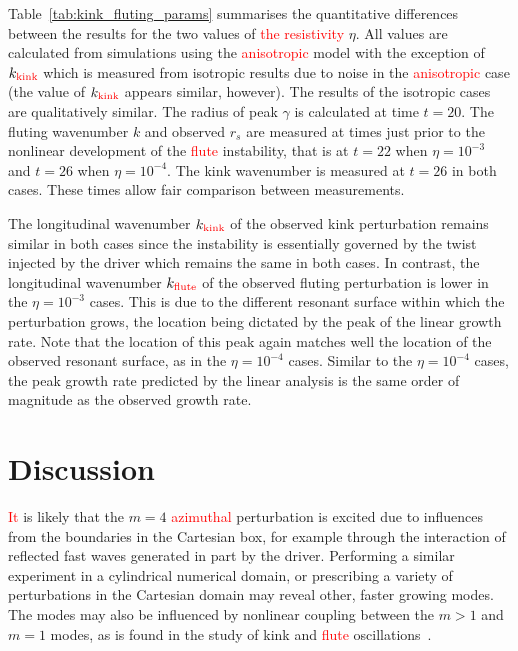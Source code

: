 \documentclass[12pt]{article}
\newcommand{\rs}[2]{\textcolor{red}{#2}}
\begin{document}
Table~\ref{tab:kink_fluting_params} summarises the quantitative
differences between the results for the two values of \rs{}{the
  resistivity} $\eta$. All values are calculated from simulations using the \rs{switching}{anisotropic} model with the exception of $k_{\rs{kink}{\text{kink}}}$ which is measured from isotropic results due to noise in the \rs{switching}{anisotropic} case (the value of $k_{\rs{kink}{\text{kink}}}$ appears similar, however). The results of the isotropic cases are qualitatively similar. The radius of peak $\gamma$ is calculated at time $t=20$. The fluting wavenumber $k$ and observed $r_s$ are measured at times just prior to the nonlinear development of the \rs{fluting}{flute} instability, that is at $t=22$ when $\eta=10^{-3}$ and $t=26$ when $\eta = 10^{-4}$. The kink wavenumber is measured at $t=26$ in both cases. These times allow fair comparison between measurements.

The longitudinal wavenumber $k_{\rs{kink}{\text{kink}}}$ of the observed kink perturbation remains similar in both cases since the instability is essentially governed by the twist injected by the driver which remains the same in both cases. In contrast, the longitudinal wavenumber $k_{\rs{flute}{\text{flute}}}$ of the observed fluting perturbation is lower in the $\eta=10^{-3}$ cases. This is due to the different resonant surface within which the perturbation grows, the location being dictated by the peak of the linear growth rate. Note that the location of this peak again matches well the location of the observed resonant surface, as in the $\eta=10^{-4}$ cases. Similar to the $\eta=10^{-4}$ cases, the peak growth rate predicted by the linear analysis is the same order of magnitude as the observed growth rate.

\section{Discussion}

\rs{Due to the perturbations arising from numerical noise, it}{It} is
likely that the $m=4$ \rs{}{azimuthal} perturbation is excited due to
influences from the boundaries in the Cartesian box, for example
through the interaction of reflected fast waves generated in part by
the driver. Performing a similar experiment in a cylindrical numerical
domain, or prescribing a variety of perturbations in the Cartesian
domain may reveal other, faster growing modes. The modes may also be
influenced by nonlinear coupling between the $m>1$ and $m=1$ modes, as
is found in the study of kink and \rs{fluting}{flute}
oscillations~\cite{terradasEffectMagneticTwist2018,rudermanNonlinearGenerationFluting2017a}. 
\end{document}
